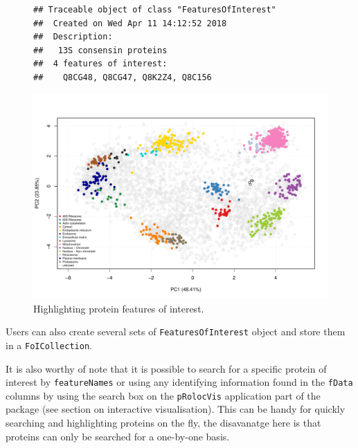 \begin{figure}[!ht]
  \centering
\begin{knitrout}
\color{fgcolor}\begin{kframe}
\begin{alltt}
 \hlkwb{<-} \hlstd{(}\hlstd{,} \hlstd{,} \hlstd{,} \hlstd{)}
 \hlkwb{<-} \hlstd{(} \hlstd{=} \hlstd{,}
                              
                              
\end{alltt}
\begin{verbatim}
## Traceable object of class "FeaturesOfInterest"
##  Created on Wed Apr 11 14:12:52 2018 
##  Description:
##   13S consensin proteins
##  4 features of interest:
##    Q8CG48, Q8CG47, Q8K2Z4, Q8C156
\end{verbatim}
\begin{alltt}
  \hlstd{=} \hlstd{)}
\end{alltt}
\end{kframe}
\includegraphics[width=.8\textwidth]{figure/foi-1} 

\end{knitrout}
  \caption{Highlighting protein features of interest.}
  \label{fig:foi}
\end{figure}

Users can also create several sets of \texttt{FeaturesOfInterest}
object and store them in a \texttt{FoICollection}.

It is also worthy of note that it is possible to search for a
specific protein of interest by \texttt{featureNames} or using any
identifying information found in the \texttt{fData} columns by using
the search box on the \texttt{pRolocVis} application part of the
 package (see section on interactive
visualisation). This can be handy for quickly searching and
highlighting proteins on the fly, the disavanatge here is that
proteins can only be searched for a one-by-one basis.

